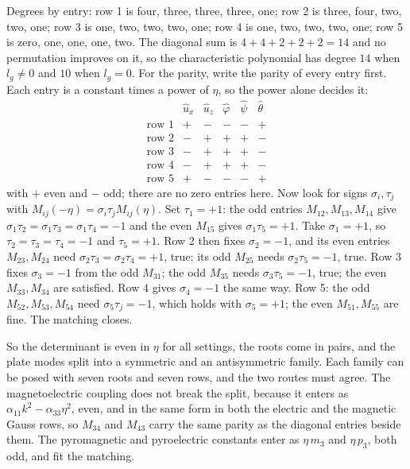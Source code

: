 \documentclass[11pt]{article}
\makeatletter
\newif\ifshowworked
\newenvironment{worked}{%
  \ifshowworked\par\smallskip\noindent\textit{Working.}\par\smallskip\else
  \setbox\z@\vbox\bgroup\fi}{\ifshowworked\par\smallskip\else\egroup\fi}
\makeatother
\begin{document}
\begin{worked}
Degrees by entry: row 1 is four, three, three, three, one; row 2 is three, four, two, two, one; row 3 is
one, two, two, two, one; row 4 is one, two, two, two, one; row 5 is zero, one, one, one, two. The diagonal
sum is $4+4+2+2+2=14$ and no permutation improves on it, so the characteristic polynomial has degree $14$
when $l_g\ne0$ and $10$ when $l_g=0$.
For the parity, write the parity of every entry first. Each entry is a constant times a power of $\eta$, so
the power alone decides it:
\begin{equation}
\begin{array}{c|ccccc}
 & \hat u_x & \hat u_z & \hat\varphi & \hat\psi & \hat\theta\\\hline
\text{row 1} & + & - & - & - & +\\
\text{row 2} & - & + & + & + & -\\
\text{row 3} & - & + & + & + & -\\
\text{row 4} & - & + & + & + & -\\
\text{row 5} & + & - & - & - & +
\end{array}
\end{equation}
with $+$ even and $-$ odd; there are no zero entries here. Now look for signs $\sigma_i,\tau_j$ with
$M_{ij}(-\eta)=\sigma_i\tau_jM_{ij}(\eta)$.
Set $\tau_1=+1$: the odd entries $M_{12},M_{13},M_{14}$ give $\sigma_1\tau_2=\sigma_1\tau_3=\sigma_1\tau_4=-1$
and the even $M_{15}$ gives $\sigma_1\tau_5=+1$. Take $\sigma_1=+1$, so $\tau_2=\tau_3=\tau_4=-1$ and
$\tau_5=+1$. Row 2 then fixes $\sigma_2=-1$, and its even entries $M_{23},M_{24}$ need
$\sigma_2\tau_3=\sigma_2\tau_4=+1$, true; its odd $M_{25}$ needs $\sigma_2\tau_5=-1$, true. Row 3 fixes
$\sigma_3=-1$ from the odd $M_{31}$; the odd $M_{35}$ needs $\sigma_3\tau_5=-1$, true; the even
$M_{33},M_{34}$ are satisfied. Row 4 gives $\sigma_4=-1$ the same way. Row 5: the odd
$M_{52},M_{53},M_{54}$ need $\sigma_5\tau_j=-1$, which holds with $\sigma_5=+1$; the even $M_{51},M_{55}$
are fine. The matching closes.
\end{worked}

So the determinant is even in $\eta$ for all settings, the roots come in pairs, and the plate modes split
into a symmetric and an antisymmetric family. Each family can be posed with seven roots and seven rows, and
the two routes must agree. The magnetoelectric coupling does not break the split, because it enters as
$\alpha_{11}k^2-\alpha_{33}\eta^2$, even, and in the same form in both the electric and the magnetic Gauss
rows, so $M_{34}$ and $M_{43}$ carry the same parity as the diagonal entries beside them. The pyromagnetic
and pyroelectric constants enter as $\eta\,m_3$ and $\eta\,p_3$, both odd, and fit the matching.
\end{document}
